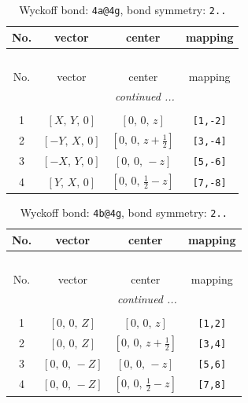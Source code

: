 \documentclass[fleqn,8pt]{jsarticle}
\begin{document}
\begin{longtable}{cccc}
\caption{Wyckoff bond: {\tt 4a@4g}, bond symmetry: {\tt 2..}}
 \\
 \hline \hline
No. & vector & center & mapping \\ \hline \endfirsthead

\multicolumn{3}{l}{\tablename\ \thetable{}} \\
 \hline \hline
No. & vector & center & mapping \\ \hline \endhead

 \hline \hline
\multicolumn{3}{r}{\footnotesize\it continued ...} \\ \endfoot

 \hline \hline
\multicolumn{3}{r}{} \\ \endlastfoot

1 & $\left[ X,\, Y,\, 0 \right]$ & $\left[ 0,\, 0,\, z \right]$ & {\tt [1,-2]} \\ \hline
2 & $\left[ - Y,\, X,\, 0 \right]$ & $\left[ 0,\, 0,\, z + \frac{1}{2} \right]$ & {\tt [3,-4]} \\ \hline
3 & $\left[ - X,\, Y,\, 0 \right]$ & $\left[ 0,\, 0,\, - z \right]$ & {\tt [5,-6]} \\ \hline
4 & $\left[ Y,\, X,\, 0 \right]$ & $\left[ 0,\, 0,\, \frac{1}{2} - z \right]$ & {\tt [7,-8]} \\
\end{longtable}
\renewcommand{\arraystretch}{1.2}
\begin{longtable}{cccc}
\caption{Wyckoff bond: {\tt 4b@4g}, bond symmetry: {\tt 2..}}
 \\
 \hline \hline
No. & vector & center & mapping \\ \hline \endfirsthead

\multicolumn{3}{l}{\tablename\ \thetable{}} \\
 \hline \hline
No. & vector & center & mapping \\ \hline \endhead

 \hline \hline
\multicolumn{3}{r}{\footnotesize\it continued ...} \\ \endfoot

 \hline \hline
\multicolumn{3}{r}{} \\ \endlastfoot

1 & $\left[ 0,\, 0,\, Z \right]$ & $\left[ 0,\, 0,\, z \right]$ & {\tt [1,2]} \\ \hline
2 & $\left[ 0,\, 0,\, Z \right]$ & $\left[ 0,\, 0,\, z + \frac{1}{2} \right]$ & {\tt [3,4]} \\ \hline
3 & $\left[ 0,\, 0,\, - Z \right]$ & $\left[ 0,\, 0,\, - z \right]$ & {\tt [5,6]} \\ \hline
4 & $\left[ 0,\, 0,\, - Z \right]$ & $\left[ 0,\, 0,\, \frac{1}{2} - z \right]$ & {\tt [7,8]} \\
\end{longtable}
\end{document}
